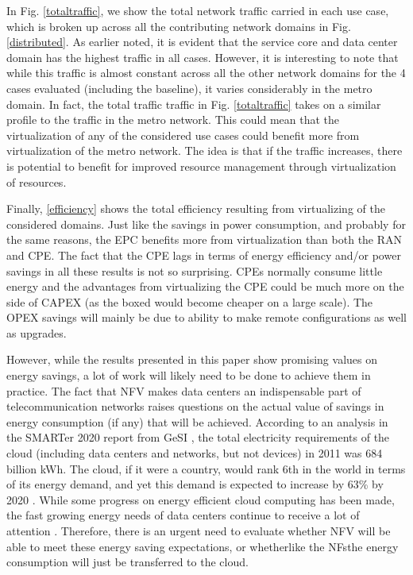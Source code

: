 \documentclass[conference]{IEEEtran}
\begin{document}
In Fig. \ref{totaltraffic}, we show the total network traffic carried in each use case, which is broken up across all the contributing network domains in Fig. \ref{distributed}. As earlier noted, it is evident that the service core and data center domain has the highest traffic in all cases. However, it is interesting to note that while this traffic is almost constant across all the other network domains for the 4 cases evaluated (including the baseline), it varies considerably in the metro domain. In fact, the total traffic traffic in Fig. \ref{totaltraffic} takes on a similar profile to the traffic in the metro network. This could mean that the virtualization of any of the considered use cases could benefit more from virtualization of the metro network. The idea is that if the traffic increases, there is potential to benefit for improved resource management through virtualization of resources.

Finally, \ref{efficiency} shows the total efficiency resulting from virtualizing of the considered domains. Just like the savings in power consumption, and probably for the same reasons, the EPC benefits more from virtualization than both the RAN and CPE. The fact that the CPE lags in terms of energy efficiency and/or power savings in all these results is not so surprising. CPEs normally consume little energy and the advantages from virtualizing the CPE could be much more on the side of CAPEX (as the boxed would become cheaper on a large scale). The OPEX savings will mainly be due to ability to make remote configurations as well as upgrades.


However, while the results presented in this paper show promising values on energy savings, a lot of work will likely need to be done to achieve them in practice. The fact that NFV makes data centers an indispensable part of telecommunication networks raises questions on the actual value of savings in energy consumption (if any) that will be achieved. According to an analysis in the SMARTer 2020 report from GeSI \cite{GESI}, the total electricity requirements of the cloud (including data centers and networks, but not devices) in 2011 was 684 billion kWh. The cloud, if it were a country, would rank 6th in the world in terms of its energy demand, and yet this demand is expected to increase by 63\% by 2020 \cite{CLICKCLEAN}. While some progress on energy efficient cloud computing has been made, the fast growing energy needs of data centers continue to receive a lot of attention \cite{USDCS, BeloglazovBLZ11}. Therefore, there is an urgent need to evaluate whether NFV will be able to meet these energy saving expectations, or whetherlike the NFsthe energy consumption will just be transferred to the cloud. 
\end{document}
